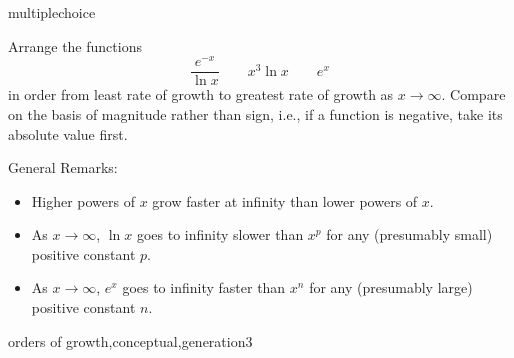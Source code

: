 \documentclass{ximera}
\begin{document}
\begin{question}[GrowthOrdINF002]
\begin{type}
multiplechoice
\end{type}
Arrange the functions 
\[ \frac{e^{- x}}{\ln{x}} \qquad x^{3} \ln{x} \qquad e^{x} \]
in order from least rate of growth to greatest rate of growth as \(x \rightarrow \infty\). Compare on the basis of magnitude rather than sign, i.e., if a function is negative, take its absolute value first.
\begin{multiplechoice}
 \choicebreak
{}
\end{multiplechoice}
\begin{feedback}
General Remarks:
\begin{itemize} \item Higher powers of \(x\) grow faster at infinity than lower powers of \(x\).
\item As \(x \rightarrow \infty\), \(\ln x\) goes to infinity slower than \(x^p\) for any (presumably small) positive constant \(p\).
\item As \(x \rightarrow \infty\), \(e^x\) goes to infinity faster than \(x^n\) for any (presumably large) positive constant \(n\).
\end{itemize}
\end{feedback}
\begin{keywords}
orders of growth,conceptual,generation3
\end{keywords}
\end{question}
\end{document}
